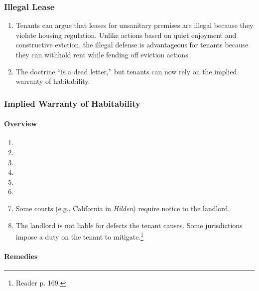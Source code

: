 \subsubsection{Illegal Lease} %

\begin{enumerate}
    \item Tenants can argue that leases for unsanitary premises are illegal 
    because they violate housing regulation. Unlike actions based on quiet 
    enjoyment and constructive eviction, the illegal defense is advantageous 
    for tenants because they can withhold rent while fending off eviction 
    actions.
    \item The doctrine ``is a dead letter,'' but tenants can now rely on the 
    implied warranty of habitability. %
\end{enumerate}

\subsubsection{Implied Warranty of Habitability} %

\paragraph{Overview}

\begin{enumerate}
    \item %
    \item %
    \item %
    \item %
    \item %
    \item %
    \item Some courts (e.g., California in \emph{Hilden}) require notice to 
    the landlord.
    \item The landlord is not liable for defects the tenant causes. Some 
    jurisdictions impose a duty on the tenant to mitigate.\footnote{Reader p. 
    169.}
\end{enumerate}

\paragraph{Remedies}

